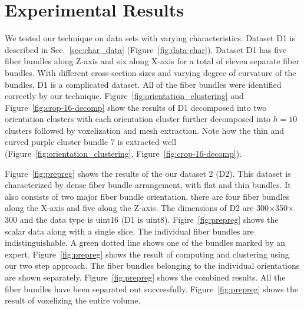 \section{Experimental Results}
\label {sec:results}
We tested our technique on data sets with varying characteristics.
Dataset D1 is described in Sec.~\ref{sec:char_data} (Figure~\ref{fig:data-char}). Dataset D1 has five fiber bundles along Z-axis and six along X-axis for a total of eleven separate fiber bundles. 
With different cross-section sizes and varying degree of curvature of the bundles, D1 is a complicated dataset. All of the fiber bundles were identified correctly by our technique.
Figure~\ref{fig:orientation_clustering} and Figure~\ref{fig:crop-16-decomp} show the results of D1 decomposed into two orientation clusters with each orientation cluster further decomposed into $h=10$ clusters followed by voxelization and mesh extraction.  Note how the thin and curved purple cluster bundle 7 is extracted well (Figure~\ref{fig:orientation_clustering}, Figure~\ref{fig:crop-16-decomp}). 

Figure~\ref{fig:prepreg} shows the results of the our dataset 2 (D2). This dataset is characterized by dense fiber bundle arrangement, with flat and thin bundles. 
It also consists of two major fiber bundle orientation, there are four fiber bundles along the X-axis and five along the Z-axis. The dimensions of D2 are 300$\times$350$\times$300 and the data type is uint16 (D1 is uint8). Figire~\ref{fig:prepreg} shows the scalar data along with a single slice. The individual fiber bundles are indistinguishable. A green dotted line shows one of the bundles marked by an expert. 
Figure~\ref{fig:prepreg} shows the result of computing \mt and clustering using our two step approach. The fiber bundles belonging to the individual orientations are shown separately.
Figure~\ref{fig:prepreg} shows the combined results. All the fiber bundles have been separated out successfully. Figure~\ref{fig:prepreg} shows the result of voxelizing the entire volume. 
